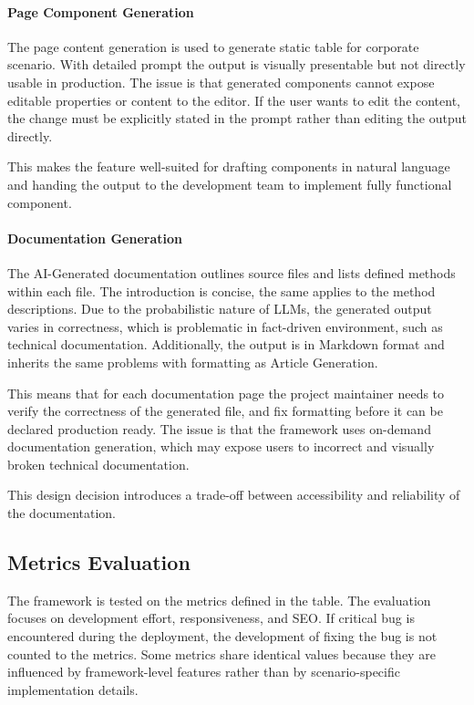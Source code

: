 \paragraph{Page Component Generation}
The page content generation is used to generate static table for corporate scenario.
With detailed prompt the output is visually presentable but not directly usable in production.
The issue is that generated components cannot expose editable properties or content to the editor.
If the user wants to edit the content, the change must be explicitly stated in the prompt rather than editing the output directly.

This makes the feature well-suited for drafting components in natural language and handing the output to the development team
to implement fully functional component.

\paragraph{Documentation Generation}
The AI-Generated documentation outlines source files and lists defined methods within each file.
The introduction is concise, the same applies to the method descriptions.
Due to the probabilistic nature of LLMs, the generated output varies in correctness, which is problematic in fact-driven environment,
such as technical documentation.
Additionally, the output is in Markdown format and inherits the same problems with formatting as Article Generation.

This means that for each documentation page the project maintainer needs to verify the correctness of the generated file,
and fix formatting before it can be declared production ready.
The issue is that the framework uses on-demand documentation generation,
which may expose users to incorrect and visually broken technical documentation.

This design decision introduces a trade-off between accessibility and reliability of the documentation.



\subsection{Metrics Evaluation}\label{subsec:metrics-evaluation}
The framework is tested on the metrics defined in the table.
The evaluation focuses on development effort, responsiveness, and SEO\@.
If critical bug is encountered during the deployment, the development of fixing the bug is not counted to the metrics.
Some metrics share identical values because they are influenced by framework-level features
rather than by scenario-specific implementation details.

